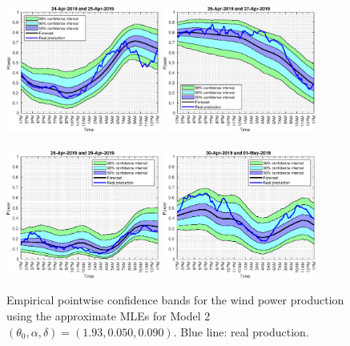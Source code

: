 \documentclass[11pt]{article}
\theoremstyle{definition}
\begin{document}
\begin{figure}[H]
\centering
\includegraphics[width=0.45\textwidth]{../../MATLAB_Files/Results/bands_testing_days/optimal_value/withDate/1.eps}
\includegraphics[width=0.45\textwidth]{../../MATLAB_Files/Results/bands_testing_days/optimal_value/withDate/2.eps}\\
\quad\\
\includegraphics[width=0.45\textwidth]{../../MATLAB_Files/Results/bands_testing_days/optimal_value/withDate/3.eps}
\includegraphics[width=0.45\textwidth]{../../MATLAB_Files/Results/bands_testing_days/optimal_value/withDate/4.eps}
\caption{Empirical pointwise confidence bands for the wind power production using the approximate MLEs for Model 2 $(\theta_0, \alpha ,\delta)=(1.93,0.050,0.090)$. Blue line: real production.}
\label{fig:confidence_bands}
\end{figure}
\end{document}
